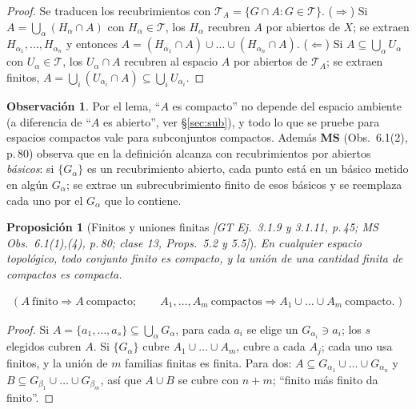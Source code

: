 \documentclass[11pt,a4paper]{article}
\newcommand{\lgc}[1]{\par\vspace{-3pt}\begin{gather*}\big(\;#1\;\big)\end{gather*}\vspace{-6pt}}
\theoremstyle{definition}
\newtheorem{observacion}[definicion]{Observación}
\theoremstyle{plain}
\newtheorem{proposicion}[definicion]{Proposición}
\newcommand{\fnt}[1]{{\normalfont\small\itshape\color{gray!150!black}[#1]}}
\newcommand{\tp}{\mathcal{T}}
\begin{document}
\begin{proof}
Se traducen los recubrimientos con $\tp_A=\{G\cap A: G\in\tp\}$. ($\Rightarrow$) Si $A=\bigcup_\alpha(H_\alpha\cap A)$ con $H_\alpha\in\tp$, los $H_\alpha$ recubren $A$ por abiertos de $X$; se extraen $H_{\alpha_1},\dots,H_{\alpha_n}$ y entonces $A=(H_{\alpha_1}\cap A)\cup\dots\cup(H_{\alpha_n}\cap A)$. ($\Leftarrow$) Si $A\subseteq\bigcup_\alpha U_\alpha$ con $U_\alpha\in\tp$, los $U_\alpha\cap A$ recubren al espacio $A$ por abiertos de $\tp_A$; se extraen finitos, $A=\bigcup_{i}(U_{\alpha_i}\cap A)\subseteq\bigcup_iU_{\alpha_i}$.
\end{proof}

\begin{observacion}
Por el lema, ``$A$ es compacto'' no depende del espacio ambiente (a diferencia de ``$A$ es abierto'', ver \S\ref{sec:sub}), y todo lo que se pruebe para espacios compactos vale para subconjuntos compactos. Además \textbf{MS} (Obs.\ 6.1(2), p.\,80) observa que en la definición alcanza con recubrimientos por abiertos \emph{básicos}: si $\{G_\alpha\}$ es un recubrimiento abierto, cada punto está en un básico metido en algún $G_\alpha$; se extrae un subrecubrimiento finito de esos básicos y se reemplaza cada uno por el $G_\alpha$ que lo contiene.
\end{observacion}

\begin{proposicion}[Finitos y uniones finitas \fnt{GT Ej.\ 3.1.9 y 3.1.11, p.\,45; MS Obs.\ 6.1(1),(4), p.\,80; clase 13, Props.\ 5.2 y 5.5}]\label{cp:finitos}
En cualquier espacio topológico, todo conjunto finito es compacto, y la unión de una cantidad finita de compactos es compacta.
\lgc{A\ \text{finito}\Rightarrow A\ \text{compacto};\qquad A_1,\dots,A_m\ \text{compactos}\Rightarrow A_1\cup\dots\cup A_m\ \text{compacto}.}
\end{proposicion}

\begin{proof}
Si $A=\{a_1,\dots,a_s\}\subseteq\bigcup_\alpha G_\alpha$, para cada $a_i$ se elige un $G_{\alpha_i}\ni a_i$; los $s$ elegidos cubren $A$. Si $\{G_\alpha\}$ cubre $A_1\cup\dots\cup A_m$, cubre a cada $A_j$; cada uno usa finitos, y la unión de $m$ familias finitas es finita. Para dos: $A\subseteq G_{\alpha_1}\cup\dots\cup G_{\alpha_n}$ y $B\subseteq G_{\beta_1}\cup\dots\cup G_{\beta_m}$, así que $A\cup B$ se cubre con $n+m$; ``finito más finito da finito''.
\end{proof}
\end{document}
